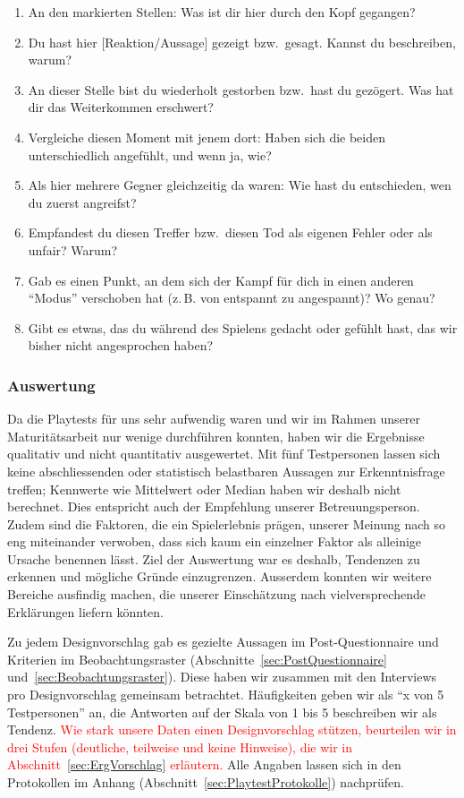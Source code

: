 \documentclass[../Main.tex]{subfiles}
\begin{document}
\begin{enumerate}[label=\textbf{I\arabic*}, leftmargin=1.5cm, itemsep=0.5em]
    \item An den markierten Stellen: Was ist dir hier durch den Kopf gegangen?
    \item Du hast hier [Reaktion/Aussage] gezeigt bzw.\ gesagt. Kannst du beschreiben, warum?
    \item An dieser Stelle bist du wiederholt gestorben bzw.\ hast du gezögert. Was hat dir das Weiterkommen erschwert?
    \item Vergleiche diesen Moment mit jenem dort: Haben sich die beiden unterschiedlich angefühlt, und wenn ja, wie?
    \item Als hier mehrere Gegner gleichzeitig da waren: Wie hast du entschieden, wen du zuerst angreifst?
    \item Empfandest du diesen Treffer bzw.\ diesen Tod als eigenen Fehler oder als unfair? Warum?
    \item Gab es einen Punkt, an dem sich der Kampf für dich in einen anderen \enquote{Modus} verschoben hat (z.\,B. von entspannt zu angespannt)? Wo genau?
    \item Gibt es etwas, das du während des Spielens gedacht oder gefühlt hast, das wir bisher nicht angesprochen haben?
\end{enumerate}

\subsubsection{Auswertung} \label{sec:Auswertung}
Da die Playtests für uns sehr aufwendig waren und wir im Rahmen unserer Maturitätsarbeit nur wenige durchführen konnten, haben wir die Ergebnisse qualitativ und nicht quantitativ ausgewertet. Mit fünf Testpersonen lassen sich keine abschliessenden oder statistisch belastbaren Aussagen zur Erkenntnisfrage treffen; Kennwerte wie Mittelwert oder Median haben wir deshalb nicht berechnet. Dies entspricht auch der Empfehlung unserer Betreuungsperson. Zudem sind die Faktoren, die ein Spielerlebnis prägen, unserer Meinung nach so eng miteinander verwoben, dass sich kaum ein einzelner Faktor als alleinige Ursache benennen lässt. Ziel der Auswertung war es deshalb, Tendenzen zu erkennen und mögliche Gründe einzugrenzen. Ausserdem konnten wir weitere Bereiche ausfindig machen, die unserer Einschätzung nach vielversprechende Erklärungen liefern könnten.

Zu jedem Designvorschlag gab es gezielte Aussagen im Post-Questionnaire und Kriterien im Beobachtungsraster (Abschnitte~\ref{sec:PostQuestionnaire} und~\ref{sec:Beobachtungsraster}). Diese haben wir zusammen mit den Interviews pro Designvorschlag gemeinsam betrachtet. Häufigkeiten geben wir als \enquote{x von 5 Testpersonen} an, die Antworten auf der Skala von 1 bis 5 beschreiben wir als Tendenz. \textcolor{red}{Wie stark unsere Daten einen Designvorschlag stützen, beurteilen wir in drei Stufen (deutliche, teilweise und keine Hinweise), die wir in Abschnitt~\ref{sec:ErgVorschlag} erläutern.} Alle Angaben lassen sich in den Protokollen im Anhang (Abschnitt~\ref{sec:PlaytestProtokolle}) nachprüfen.
\end{document}
